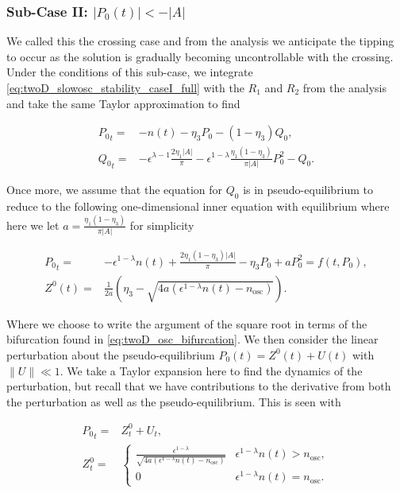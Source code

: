 \subsubsection{Sub-Case II: $|P_0(t)|<-|A|$}

We called this the crossing case and from the analysis we anticipate the tipping to occur as the solution is gradually becoming uncontrollable with the crossing. Under the conditions of this sub-case, we integrate \eqref{eq:twoD_slowosc_stability_caseI_full} with the $R_1$ and $R_2$ from the analysis and take the same Taylor approximation to find 

\begin{equation}\label{eq:twoD_slowosc_stability_subcaseII,full}
\begin{aligned}
{P_0}_t =& -n(t)-\eta_3 P_0-(1-\eta_3)Q_0,\\
{Q_0}_t =&-\epsilon^{\lambda-1}\frac{2\eta_1|A|}{\pi}-\epsilon^{1-\lambda}\frac{\eta_1(1-\eta_3)}{\pi|A|}P_0^2-Q_0.
\end{aligned}
\end{equation}

Once more, we assume that the equation for $Q_0$ is in pseudo-equilibrium 
to reduce to the following one-dimensional inner equation with equilibrium where here we let $a=\frac{\eta_1(1-\eta_3)}{\pi|A|}$ for simplicity

\begin{equation}\label{eq:twoD_slowosc_stability_subcaseII,reduced}
\begin{aligned}
{P_0}_t =& -\epsilon^{1-\lambda}n(t)+\frac{2\eta_1(1-\eta_3)|A|}{\pi}-\eta_3 P_0+aP_0^2=f(t,P_0),\\
Z^0(t) =& \frac{1}{2a}\left(\eta_3-\sqrt{4a(\epsilon^{1-\lambda}n(t)-n_{\text{osc}})}\right).
\end{aligned}
\end{equation}

Where we choose to write the argument of the square root in terms of the bifurcation found in \eqref{eq:twoD_osc_bifurcation}. We then consider the linear perturbation about the pseudo-equilibrium $P_0(t)= Z^0(t)+U(t)$ with $\lVert U\rVert \ll 1$. We take a Taylor expansion here to find the dynamics of the perturbation, but recall that we have contributions to the derivative from both the perturbation as well as the pseudo-equilibrium. This is seen with

\begin{equation}
\begin{aligned}
{P_0}_t =& Z^0_t+U_t,\\
Z^0_t=&\begin{cases}
\frac{\epsilon^{1-\lambda}}{\sqrt{4a(\epsilon^{1-\lambda}n(t)-n_{\text{osc}})}} & \epsilon^{1-\lambda}n(t)>n_{\text{osc}},\\
0 & \epsilon^{1-\lambda}n(t)=n_{\text{osc}}.
\end{cases}
\end{aligned}
\end{equation}


